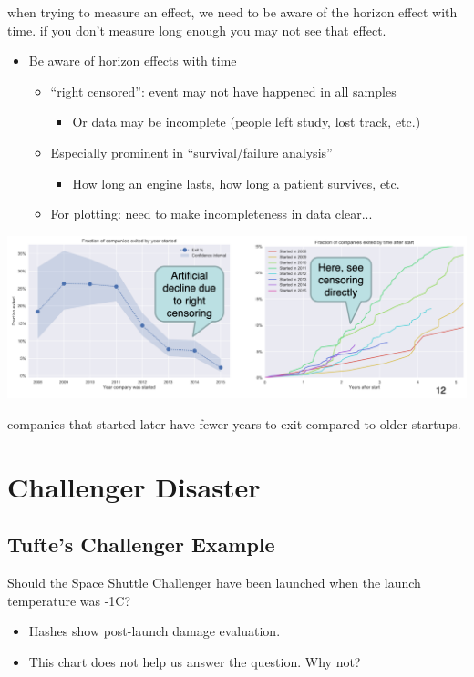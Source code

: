 \documentclass[11pt]{article}
\theoremstyle{definition}
\begin{document}
when trying to measure an effect, 
we need to be aware of the horizon effect with time.
if you don't measure long enough you may not see that effect.

\begin{itemize}
    \item Be aware of horizon effects with time
    \begin{itemize}
        \item “right censored”: event may not have happened in all samples
        \begin{itemize}
            \item Or data may be incomplete (people left study, lost track, etc.)
        \end{itemize}
        \item Especially prominent in “survival/failure analysis”
        \begin{itemize}
            \item How long an engine lasts, how long a patient survives, etc.
        \end{itemize}
        \item For plotting: need to make incompleteness in data clear...
    \end{itemize}
\end{itemize}

\includegraphics[width=\textwidth]{33.png}

companies that started later have fewer years to exit compared to older startups.

\section{Challenger Disaster}

\subsection{Tufte’s Challenger Example}
Should the Space Shuttle Challenger have been
launched when the launch temperature was -1C?
\begin{itemize}
    \item Hashes show
    post-launch
    damage
    evaluation.
    \item This chart
    does not help
    us answer
    the question.
    Why not?
\end{itemize}
\end{document}

